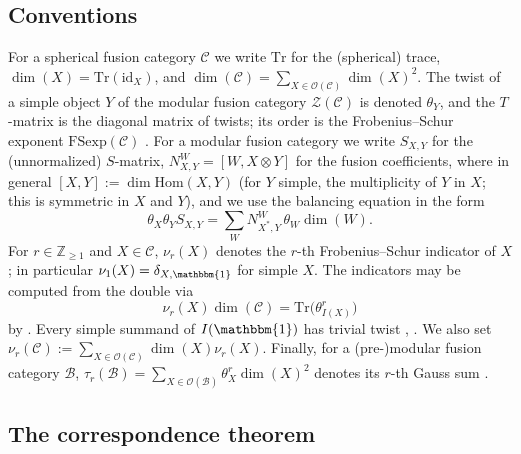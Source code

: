 \documentclass[10pt]{article}
\theoremstyle{plain}
\theoremstyle{definition}
\theoremstyle{plain}
\begin{document}

\subsection{Conventions}\label{subsec:conventions}

\par For a spherical fusion category $\mathcal{C}$ we write $\mathrm{Tr}$ for the (spherical) trace, $\dim(X)=\mathrm{Tr}(\mathrm{id}_X)$, and $\dim(\mathcal{C})=\sum_{X\in\mathcal{O}(\mathcal{C})}\dim(X)^2$. The twist of a simple object $Y$ of the modular fusion category $\mathcal{Z}(\mathcal{C})$ is denoted $\theta_Y$, and the $T$-matrix is the diagonal matrix of twists; its order is the Frobenius--Schur exponent $\mathrm{FSexp}(\mathcal{C})$ \cite[Theorem 5.5]{MR2313527}. For a modular fusion category we write $S_{X,Y}$ for the (unnormalized) $S$-matrix, $N_{X,Y}^W=[W,X\otimes Y]$ for the fusion coefficients, where in general $[X,Y]:=\dim\mathrm{Hom}(X,Y)$ (for $Y$ simple, the multiplicity of $Y$ in $X$; this is symmetric in $X$ and $Y$), and we use the balancing equation in the form
\begin{equation}\label{eq:balancing}
    \theta_X\theta_YS_{X,Y}=\sum_{W}N_{X^\ast,Y}^W\,\theta_W\dim(W).
\end{equation}
For $r\in\mathbb{Z}_{\geq1}$ and $X\in\mathcal{C}$, $\nu_r(X)$ denotes the $r$-th Frobenius--Schur indicator of $X$ \cite{MR2313527}; in particular $\nu_1(X)=\delta_{X,\mathbbm{1}}$ for simple $X$. The indicators may be computed from the double via
\begin{equation}\label{eq:NS}
    \nu_r(X)\dim(\mathcal{C})=\mathrm{Tr}\bigl(\theta^r_{I(X)}\bigr)
\end{equation}
by \cite[Theorem 4.1]{MR2313527}. Every simple summand of $I(\mathbbm{1})$ has trivial twist \cite[Remark 4.6]{MR2313527}, \cite[Theorem 2.5]{MR3427429}. We also set $\nu_r(\mathcal{C}):=\sum_{X\in\mathcal{O}(\mathcal{C})}\dim(X)\nu_r(X)$.
Finally, for a (pre-)modular fusion category $\mathcal{B}$, $\tau_r(\mathcal{B})=\sum_{X\in\mathcal{O}(\mathcal{B})}\theta_X^r\dim(X)^2$ denotes its $r$-th Gauss sum \cite{MR3997136}.


\subsection{The correspondence theorem}\label{app:correspond}
\end{document}
